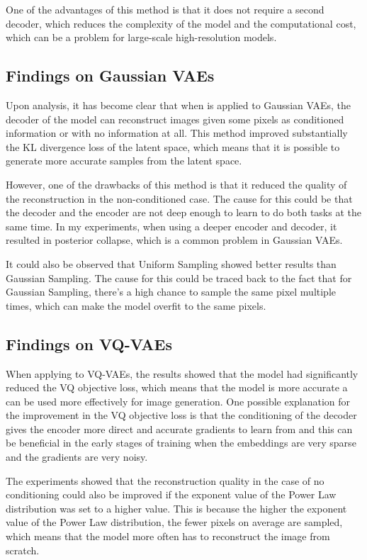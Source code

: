 One of the advantages of this method is that it does not require a second decoder, which reduces the complexity of the model and the computational cost, which can be a problem for large-scale high-resolution models.

\subsection{Findings on Gaussian VAEs}

Upon analysis, it has become clear that when  is applied to Gaussian VAEs, the decoder of the model can reconstruct images given some pixels as conditioned information or with no information at all. This method improved substantially the KL divergence loss of the latent space, which means that it is possible to generate more accurate samples from the latent space. 

However, one of the drawbacks of this method is that it reduced the quality of the reconstruction in the non-conditioned case. The cause for this could be that the decoder and the encoder are not deep enough to learn to do both tasks at the same time. In my experiments, when using a deeper encoder and decoder, it resulted in posterior collapse, which is a common problem in Gaussian VAEs.

It could also be observed that Uniform Sampling showed better results than Gaussian Sampling. The cause for this could be traced back to the fact that for Gaussian Sampling, there's a high chance to sample the same pixel multiple times, which can make the model overfit to the same pixels.


\subsection{Findings on VQ-VAEs}

When applying  to VQ-VAEs, the results showed that the model had significantly reduced the VQ objective loss, which means that the model is more accurate a can be used more effectively for image generation. One possible explanation for the improvement in the VQ objective loss is that the conditioning of the decoder gives the encoder more direct and accurate gradients to learn from and this can be beneficial in the early stages of training when the embeddings are very sparse and the gradients are very noisy.

The experiments showed that the reconstruction quality in the case of no conditioning could also be improved if the exponent value of the Power Law distribution was set to a higher value. This is because the higher the exponent value of the Power Law distribution, the fewer pixels on average are sampled, which means that the model more often has to reconstruct the image from scratch.

